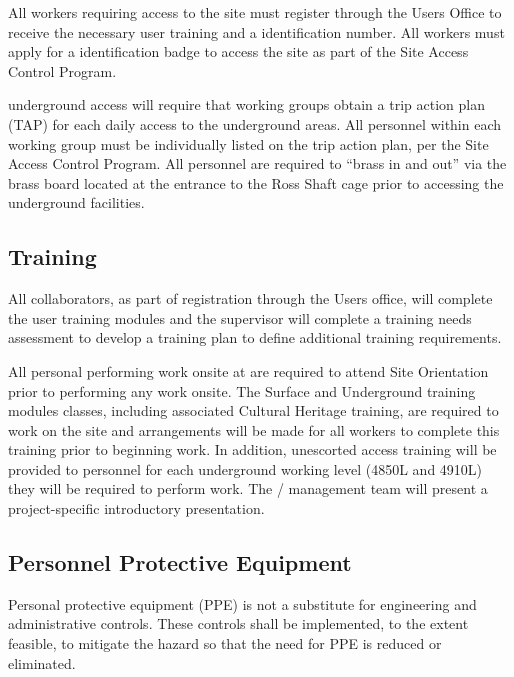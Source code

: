 All  workers requiring access to the  site must
register through the \fnal Users Office to receive the necessary user
training and a \fnal identification number. All workers must apply for
a  identification badge to access the  site as part of
the  Site Access Control Program.

 underground access will require that working groups
obtain a trip action plan (TAP) for each daily access to the
underground areas.  All personnel within each working group must be
individually listed on the trip action plan, per the  Site
Access Control Program. All personnel are required to ``brass in and
out'' via the brass board located at the entrance to the Ross Shaft
cage prior to accessing the underground facilities.

\subsection{ Training}

All  collaborators, as part of registration through the \fnal Users office,
will complete the user  training modules and the supervisor
will complete a training needs assessment to develop a training plan
to define additional   training requirements.

All personal performing work onsite at  are required to
attend   Site Orientation prior to performing
any work onsite.  The  Surface and Underground training
modules classes, including associated Cultural Heritage training, are
required to work on the site and arrangements will be made for all
workers to complete this training prior to beginning work. In
addition, unescorted access training will be provided to personnel for
each underground working level (4850L and 4910L) they will be required
to perform work.  The /  management
team will present a project-specific introductory 
presentation.

\subsection{Personnel Protective Equipment}

Personal protective equipment (PPE) is not a substitute for
engineering and administrative controls. These controls shall be
implemented, to the extent feasible, to mitigate the hazard so that
the need for PPE is reduced or eliminated.

